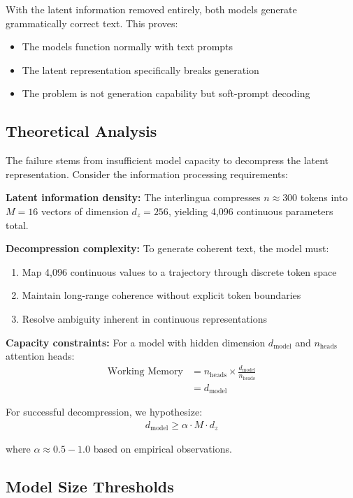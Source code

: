 \documentclass{article}
\begin{document}
With the latent information removed entirely, both models generate grammatically correct text. This proves:
\begin{itemize}
\item The models function normally with text prompts
\item The latent representation specifically breaks generation
\item The problem is not generation capability but soft-prompt decoding
\end{itemize}

\subsection{Theoretical Analysis}

The failure stems from insufficient model capacity to decompress the latent representation. Consider the information processing requirements:

\textbf{Latent information density:} The interlingua compresses $n \approx 300$ tokens into $M = 16$ vectors of dimension $d_z = 256$, yielding 4,096 continuous parameters total.

\textbf{Decompression complexity:} To generate coherent text, the model must:
\begin{enumerate}
\item Map 4,096 continuous values to a trajectory through discrete token space
\item Maintain long-range coherence without explicit token boundaries
\item Resolve ambiguity inherent in continuous representations
\end{enumerate}

\textbf{Capacity constraints:} For a model with hidden dimension $d_{\text{model}}$ and $n_{\text{heads}}$ attention heads:
\begin{align}
\text{Working Memory} &= n_{\text{heads}} \times \frac{d_{\text{model}}}{n_{\text{heads}}} \\
&= d_{\text{model}}
\end{align}

For successful decompression, we hypothesize:
\begin{align}
d_{\text{model}} \geq \alpha \cdot M \cdot d_z
\end{align}

where $\alpha \approx 0.5-1.0$ based on empirical observations.

\subsection{Model Size Thresholds}
\end{document}
